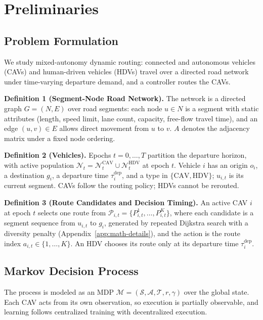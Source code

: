 \section{Preliminaries}

\subsection{Problem Formulation}

We study mixed-autonomy dynamic routing: connected and autonomous vehicles
(CAVs) and human-driven vehicles (HDVs) travel over a directed road network
under time-varying departure demand, and a controller routes the CAVs.

\noindent\textbf{Definition 1 (Segment-Node Road Network).}
The network is a directed graph \(G=(N,E)\) over road segments: each node
\(u\in N\) is a segment with static attributes (length, speed limit, lane
count, capacity, free-flow travel time), and an edge \((u,v)\in E\) allows
direct movement from \(u\) to \(v\).  \(A\) denotes the adjacency matrix
under a fixed node ordering.

\noindent\textbf{Definition 2 (Vehicles).}
Epochs \(t=0,\ldots,T\) partition the departure horizon, with active
population
\(\mathcal{N}_t=\mathcal{N}^{\mathrm{CAV}}_t\cup\mathcal{N}^{\mathrm{HDV}}_t\)
at epoch \(t\).  Vehicle \(i\) has an origin \(o_i\), a destination \(g_i\),
a departure time \(\tau_i^{\mathrm{dep}}\), and a type in
\(\{\mathrm{CAV},\mathrm{HDV}\}\); \(u_{i,t}\) is its current segment.
CAVs follow the routing policy; HDVs cannot be rerouted.

\noindent\textbf{Definition 3 (Route Candidates and Decision Timing).}
An active CAV \(i\) at epoch \(t\) selects one route from
\(\mathcal{P}_{i,t}=\{P^1_{i,t},\ldots,P^{K}_{i,t}\}\), where each candidate
is a segment sequence from \(u_{i,t}\) to \(g_i\), generated by repeated
Dijkstra search with a diversity penalty
(Appendix~\ref{app:math-details}), and the action is the route index
\(a_{i,t}\in\{1,\ldots,K\}\).  An HDV chooses its route only at its
departure time \(\tau_i^{\mathrm{dep}}\).

\subsection{Markov Decision Process}

The process is modeled as an MDP
\(\mathcal{M}=(\mathcal{S},\mathcal{A},\mathcal{T},r,\gamma)\) over the
global state.  Each CAV acts from its own observation, so execution is
partially observable, and learning follows centralized training with
decentralized execution.

